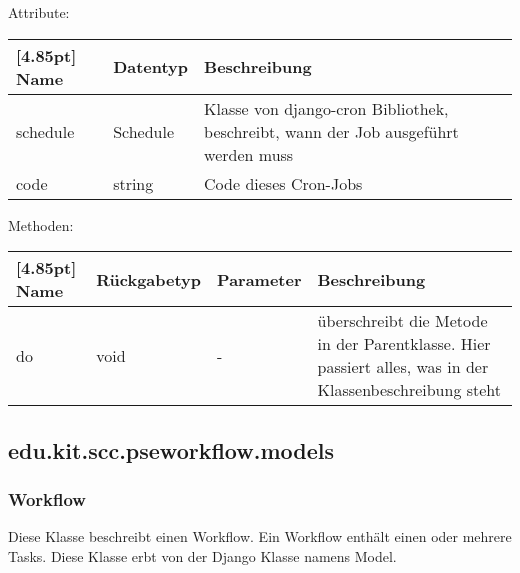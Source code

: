 		Attribute:
        \begin{center}
        	\renewcommand{\arraystretch}{1.5}
            \setlength\tabcolsep{5pt}
        	\begin{tabularx}{\textwidth}{|l|l|X|}
        		\hline
                \rowcolor[gray]{0.75}[4.85pt]            		
        	    Name & Datentyp & Beschreibung \\ \hline
        	    schedule & Schedule & Klasse von django-cron Bibliothek, beschreibt, wann der Job ausgeführt werden muss \\ \hline
        	    code & string & Code dieses Cron-Jobs \\ \hline
        	\end{tabularx}
        \end{center}
        
        Methoden:
        \begin{center}
        	\setlength\tabcolsep{5pt}
        	\renewcommand{\arraystretch}{1.5}
        	
        	\begin{tabularx}{\textwidth}{|l|l|l|X|}
        		\hline
        		\rowcolor[gray]{0.90}[4.85pt]
        		Name & Rückgabetyp & Parameter & Beschreibung \\ \hline
        		do & void & - & überschreibt die Metode in der Parentklasse. Hier passiert alles, was in der Klassenbeschreibung steht \\ \hline
        	\end{tabularx}
        \end{center}


    

        \subsection{edu.kit.scc.pseworkflow.models}
            \subsubsection{Workflow}
	        Diese Klasse beschreibt einen Workflow. Ein Workflow enthält einen oder mehrere Tasks. \newline
	        Diese Klasse erbt von der Django Klasse namens \glqq Model\grqq .
                    
